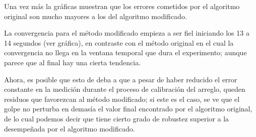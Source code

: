 \documentclass[10pt]{report}
\numberwithin{equation}{chapter}
\numberwithin{algorithm}{chapter}
\begin{document}
Una vez más la gráficas muestran que los errores cometidos por el algoritmo original son mucho mayores a los del algoritmo modificado.\par
La convergencia para el método modificado empieza a ser fiel iniciando los 13 a 14 segundos (ver gráfica), en contraste con el método original en el cual la convergencia no llega en la ventana temporal que dura el experimento; aunque parece que al final hay una cierta tendencia. \par
Ahora, es posible que esto de deba a que a pesar de haber reducido el error constante en la medición durante el proceso de calibración del arreglo, queden residuos que favorezcan al método modificado; si este es el caso, se ve que el golpe no perturba en demasía el valor final encontrado por el algoritmo original, de lo cual podemos decir que tiene cierto grado de robustez superior a la desempeñada por el algoritmo modificado.\par 
\end{document}
